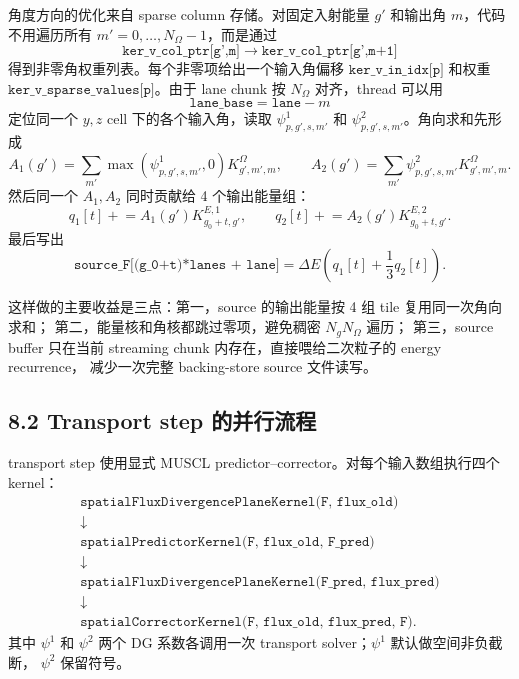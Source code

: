 \documentclass[11pt,a4paper]{ctexart}
\begin{document}
角度方向的优化来自 sparse column 存储。对固定入射能量 \(g'\) 和输出角 \(m\)，代码不用遍历所有
\(m'=0,\ldots,N_\Omega-1\)，而是通过
\begin{equation}
  \texttt{ker\_v\_col\_ptr[g',m]}
  \;\rightarrow\;
  \texttt{ker\_v\_col\_ptr[g',m+1]}
\end{equation}
得到非零角权重列表。每个非零项给出一个输入角偏移 \(\texttt{ker\_v\_in\_idx[p]}\) 和权重
\(\texttt{ker\_v\_sparse\_values[p]}\)。由于 lane chunk 按 \(N_\Omega\) 对齐，thread 可以用
\begin{equation}
  \texttt{lane\_base}=\texttt{lane}-m
\end{equation}
定位同一个 \(y,z\) cell 下的各个输入角，读取
\(\psi^1_{p,g',s,m'}\) 和 \(\psi^2_{p,g',s,m'}\)。角向求和先形成
\begin{equation}
  A_1(g')=\sum_{m'} \max(\psi^1_{p,g',s,m'},0)K^\Omega_{g',m',m},
  \qquad
  A_2(g')=\sum_{m'} \psi^2_{p,g',s,m'}K^\Omega_{g',m',m}.
\end{equation}
然后同一个 \(A_1,A_2\) 同时贡献给 4 个输出能量组：
\begin{equation}
  q_1[t]\mathrel{+}=A_1(g')K^{E,1}_{g_0+t,g'},\qquad
  q_2[t]\mathrel{+}=A_2(g')K^{E,2}_{g_0+t,g'}.
\end{equation}
最后写出
\begin{equation}
  \texttt{source\_F[(g\_0+t)*lanes + lane]}
  =
  \Delta E\left(q_1[t]+\frac13 q_2[t]\right).
\end{equation}

这样做的主要收益是三点：第一，source 的输出能量按 4 组 tile 复用同一次角向求和；
第二，能量核和角核都跳过零项，避免稠密 \(N_gN_\Omega\) 遍历；
第三，source buffer 只在当前 streaming chunk 内存在，直接喂给二次粒子的 energy recurrence，
减少一次完整 backing-store source 文件读写。

\subsection*{8.2 Transport step 的并行流程}

transport step 使用显式 MUSCL predictor--corrector。对每个输入数组执行四个 kernel：
\begin{equation}
\begin{array}{c}
\texttt{spatialFluxDivergencePlaneKernel(F, flux\_old)}\\
\downarrow\\
\texttt{spatialPredictorKernel(F, flux\_old, F\_pred)}\\
\downarrow\\
\texttt{spatialFluxDivergencePlaneKernel(F\_pred, flux\_pred)}\\
\downarrow\\
\texttt{spatialCorrectorKernel(F, flux\_old, flux\_pred, F)}.
\end{array}
\end{equation}
其中 \(\psi^1\) 和 \(\psi^2\) 两个 DG 系数各调用一次 transport solver；\(\psi^1\) 默认做空间非负截断，
\(\psi^2\) 保留符号。
\end{document}
